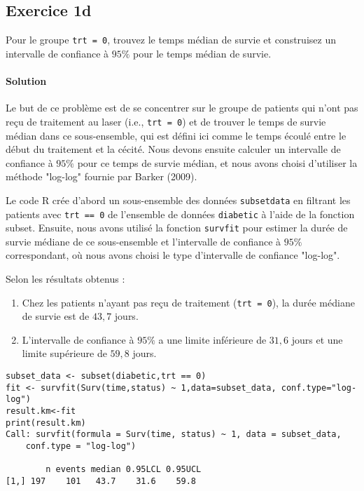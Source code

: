 \documentclass[../main.tex]{subfiles}
\begin{document}
\begin{CJK*}{UTF8}{gbsn}

\section*{Exercice 1d}
Pour le groupe \texttt{trt = 0}, trouvez le temps médian de survie et
construisez un intervalle de confiance à $95\%$ pour le temps médian de survie.
    
\paragraph{Solution}

Le but de ce problème est de se concentrer sur 
le groupe de patients qui n'ont pas reçu de traitement au laser 
(i.e., \texttt{trt = 0}) et de trouver le temps de survie médian 
dans ce sous-ensemble, qui est défini ici comme le temps écoulé 
entre le début du traitement et la cécité. 
Nous devons ensuite calculer un intervalle de confiance à 
$95\%$ pour ce temps de survie médian, et nous avons choisi d'utiliser la méthode "log-log" fournie par Barker (2009).
    
Le code R crée d'abord un sous-ensemble des données \texttt{subsetdata} 
en filtrant les patients avec \texttt{trt == 0} de l'ensemble de données 
\texttt{diabetic} à l'aide de la fonction subset. %
Ensuite, nous avons utilisé la fonction \texttt{survfit} 
pour estimer la durée de survie médiane de ce sous-ensemble 
et l'intervalle de confiance à $95\%$ correspondant, 
où nous avons choisi le type d'intervalle de confiance "log-log".
    
Selon les résultats obtenus :
\begin{enumerate}
    \item Chez les patients n'ayant pas reçu de traitement (\texttt{trt = 0}), la durée médiane de survie est de $43,7$ jours.
    \item L'intervalle de confiance à $95\%$ a une limite inférieure de $31,6$ jours et une limite supérieure de $59,8$ jours.
\end{enumerate}
    
\begin{lstlisting}
subset_data <- subset(diabetic,trt == 0)
fit <- survfit(Surv(time,status) ~ 1,data=subset_data, conf.type="log-log")
result.km<-fit
print(result.km)
Call: survfit(formula = Surv(time, status) ~ 1, data = subset_data, 
    conf.type = "log-log")
    
        n events median 0.95LCL 0.95UCL
[1,] 197    101   43.7    31.6    59.8
\end{lstlisting}

\end{CJK*}
\end{document}
